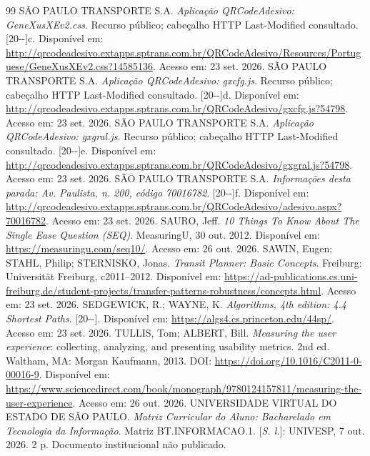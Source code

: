 \documentclass[12pt,oneside,a4paper,brazil,chapter=TITLE]{abntex2}
\begin{document}
\begin{thebibliography}{99}
 SÃO PAULO TRANSPORTE S.A. \textit{Aplicação QRCodeAdesivo: GeneXusXEv2.css}. Recurso público; cabeçalho HTTP Last-Modified consultado. [20\mbox{-}\mbox{-}]c. Disponível em: \url{http://qrcodeadesivo.extapps.sptrans.com.br/QRCodeAdesivo/Resources/Portuguese/GeneXusXEv2.css?14585136}. Acesso em: 23 set. 2026.
 SÃO PAULO TRANSPORTE S.A. \textit{Aplicação QRCodeAdesivo: gxcfg.js}. Recurso público; cabeçalho HTTP Last-Modified consultado. [20\mbox{-}\mbox{-}]d. Disponível em: \url{http://qrcodeadesivo.extapps.sptrans.com.br/QRCodeAdesivo/gxcfg.js?54798}. Acesso em: 23 set. 2026.
 SÃO PAULO TRANSPORTE S.A. \textit{Aplicação QRCodeAdesivo: gxgral.js}. Recurso público; cabeçalho HTTP Last-Modified consultado. [20\mbox{-}\mbox{-}]e. Disponível em: \url{http://qrcodeadesivo.extapps.sptrans.com.br/QRCodeAdesivo/gxgral.js?54798}. Acesso em: 23 set. 2026.
 SÃO PAULO TRANSPORTE S.A. \textit{Informações desta parada: Av. Paulista, n. 200, código 70016782}. [20\mbox{-}\mbox{-}]f. Disponível em: \url{http://qrcodeadesivo.extapps.sptrans.com.br/QRCodeAdesivo/adesivo.aspx?70016782}. Acesso em: 23 set. 2026.
 SAURO, Jeff. \textit{10 Things To Know About The Single Ease Question (SEQ)}. MeasuringU, 30 out. 2012. Disponível em: \url{https://measuringu.com/seq10/}. Acesso em: 26 out. 2026.
 SAWIN, Eugen; STAHL, Philip; STERNISKO, Jonas. \textit{Transit Planner: Basic Concepts}. Freiburg: Universität Freiburg, c2011--2012. Disponível em: \url{https://ad-publications.cs.uni-freiburg.de/student-projects/transfer-patterns-robustness/concepts.html}. Acesso em: 23 set. 2026.
 SEDGEWICK, R.; WAYNE, K. \textit{Algorithms, 4th edition: 4.4 Shortest Paths}. [20\mbox{-}\mbox{-}]. Disponível em: \url{https://algs4.cs.princeton.edu/44sp/}. Acesso em: 23 set. 2026.
 TULLIS, Tom; ALBERT, Bill. \textit{Measuring the user experience}: collecting, analyzing, and presenting usability metrics. 2nd ed. Waltham, MA: Morgan Kaufmann, 2013. DOI: \url{https://doi.org/10.1016/C2011-0-00016-9}. Disponível em: \url{https://www.sciencedirect.com/book/monograph/9780124157811/measuring-the-user-experience}. Acesso em: 26 out. 2026.
 UNIVERSIDADE VIRTUAL DO ESTADO DE SÃO PAULO. \textit{Matriz Curricular do Aluno: Bacharelado em Tecnologia da Informação}. Matriz BT.INFORMACAO.1. [\textit{S. l.}]: UNIVESP, 7 out. 2026. 2 p. Documento institucional não publicado.
\end{thebibliography}
\end{document}
